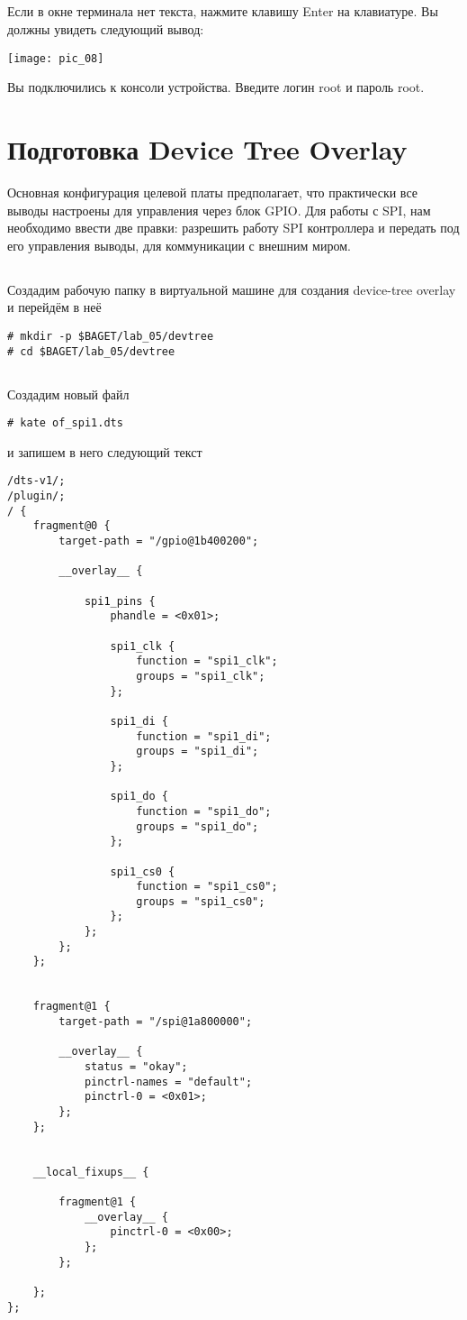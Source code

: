 \subsection{}Если в окне терминала нет текста, нажмите клавишу Enter на клавиатуре. Вы должны увидеть следующий вывод:
\begin{center}
	\texttt{[image: pic\_08]}
\end{center}
Вы подключились к консоли устройства. Введите логин root и пароль root.


\section{Подготовка Device Tree Overlay}
Основная конфигурация целевой платы предполагает, что практически все выводы настроены для управления через блок GPIO. Для работы с SPI, нам необходимо ввести две правки: разрешить работу SPI контроллера и передать под его управления выводы, для коммуникации с внешним миром. 

\subsection{} Создадим рабочую папку в виртуальной машине для создания device-tree overlay и перейдём в неё 
\begin{lstlisting}[style=bash]
# mkdir -p $BAGET/lab_05/devtree
# cd $BAGET/lab_05/devtree
\end{lstlisting}

\subsection{}Создадим новый файл
\begin{lstlisting}[style=bash]
# kate of_spi1.dts
\end{lstlisting}
и запишем в него следующий текст
\begin{lstlisting}[style=stdout]
/dts-v1/;
/plugin/;
/ {
	fragment@0 {
		target-path = "/gpio@1b400200";
		
		__overlay__ {
			
			spi1_pins {
				phandle = <0x01>;
				
				spi1_clk {
					function = "spi1_clk";
					groups = "spi1_clk";
				};
				
				spi1_di {
					function = "spi1_di";
					groups = "spi1_di";
				};
				
				spi1_do {
					function = "spi1_do";
					groups = "spi1_do";
				};
				
				spi1_cs0 {
					function = "spi1_cs0";
					groups = "spi1_cs0";
				};
			};
		};
	};
	
	
	fragment@1 { 
		target-path = "/spi@1a800000"; 
		
		__overlay__ { 
			status = "okay"; 
			pinctrl-names = "default"; 
			pinctrl-0 = <0x01>; 
		}; 
	}; 
	
	
	__local_fixups__ {
		
		fragment@1 {
			__overlay__ {
				pinctrl-0 = <0x00>;
			};
		};
		
	};
};
\end{lstlisting}

